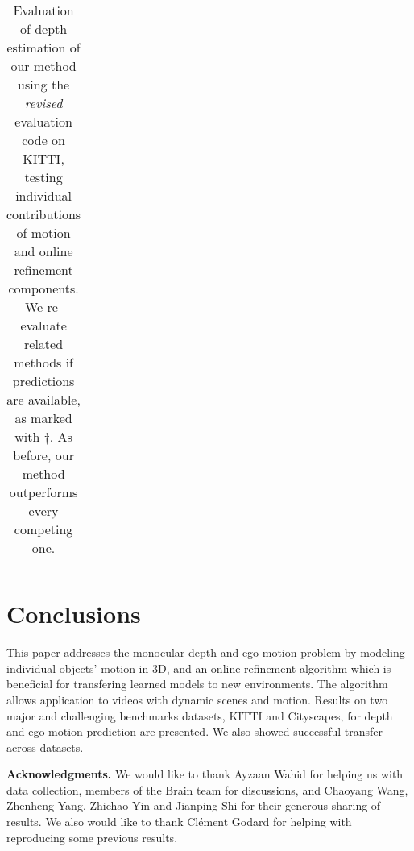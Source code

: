 \documentclass[10pt,twocolumn,letterpaper]{article}
\begin{document}
\begin{table*}[t]
{\begin{tabular}{|l|c|c|c||c|c|c|c|c|c|c|}
  \hline
  \end{tabular}
  }
  \vspace{10pt}
  \caption{Evaluation of depth estimation of our method using the \textit{revised} evaluation code on KITTI, testing individual contributions of motion and online refinement components. We re-evaluate related methods if predictions are available, as marked with $\dagger$. As before, our method outperforms every competing one.}
  \label{tab:kitti_eigenfixed}
    \vspace{-10pt}
\end{table*}

\section{Conclusions}
This paper addresses the monocular depth and ego-motion problem by modeling individual objects' motion in 3D, and an online refinement algorithm which is beneficial for transfering learned models to new environments. The algorithm allows application to videos with dynamic scenes and motion. Results on two major and challenging benchmarks datasets, KITTI and City\-scapes, for depth and ego-motion prediction are presented. We also showed successful transfer across datasets.

\textbf{Acknowledgments.}
We would like to thank Ayzaan Wahid for helping us with data collection, members of the Brain team for discussions, and
Chaoyang Wang, Zhenheng Yang, Zhichao Yin and Jianping Shi for their generous sharing of results. We also would like to thank Cl\'ement Godard for helping with reproducing some previous results.

{\small


}
\end{document}
